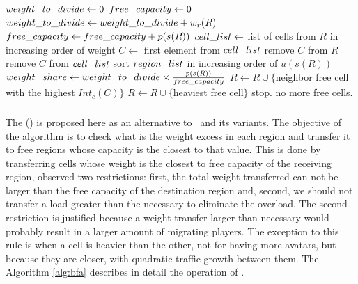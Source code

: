 \begin{algorithm}
\caption{\ggpf}
\label{alg:ggpf}
\begin{algorithmic}[1]
	 \STATE $weight\_to\_divide \leftarrow 0$
	 \STATE $free\_capacity \leftarrow 0$
	 		\STATE $weight\_to\_divide \leftarrow weight\_to\_divide + w_r(R)$
	 		\STATE $free\_capacity \leftarrow free\_capacity + p(s(R))$
	 		\STATE $cell\_list \leftarrow $ list of cells from $R$ in increasing order of weight
	 			 \STATE $C \leftarrow$ first element from $cell\_list$
	 			 \STATE remove $C$ from $R$
	 			 \STATE remove $C$ from $cell\_list$
	 		\ENDWHILE
	 \ENDFOR
	 \STATE sort $region\_list$ in increasing order of $u(s(R))$ \label{alg:ggpf:usageorder}
	 		\STATE $weight\_share \leftarrow weight\_to\_divide \times \frac{p(s(R))}{free\_capacity}$
	 		 \label{alg:ggpf:whilefraction}
	 		   		\STATE $R \leftarrow R \cup \{$neighbor free cell with the highest $Int_c(C)$$\}$
	 		   		\STATE $R \leftarrow R \cup \{$heaviest free cell$\}$ \label{alg:ggpf:freeheavycell}
	 		   \ELSE
	 		   		\STATE stop. no more free cells.
	 		   \ENDIF
	 		\ENDWHILE
	 \ENDFOR\end{algorithmic}
\end{algorithm}

\subsubsection{\bfa} %
\label{sec:alg:bfa}

The \textbf{\bfa} (\bfameaning) is proposed here as an alternative to \ggp\ and its variants. The objective of the algorithm is to check what is the weight excess in each region and transfer it to free regions whose capacity is the closest to that value. This is done by transferring cells whose weight is the closest to free capacity of the receiving region, observed two restrictions: first, the total weight transferred can not be larger than the free capacity of the destination region and, second, we should not transfer a load greater than the necessary to eliminate the overload. The second restriction is justified because a weight transfer larger than necessary would probably result in a larger amount of migrating players. The exception to this rule is when a cell is heavier than the other, not for having more avatars, but because they are closer, with quadratic traffic growth between them. The Algorithm \ref{alg:bfa} describes in detail the operation of \bfa.


